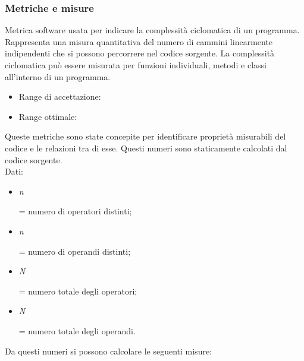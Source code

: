 \documentclass[a4paper,11pt]{article}
\begin{document}
\begin{itemize}
\subsubsection{Metriche e misure}
Metrica software usata per indicare la complessità ciclomatica di un programma. Rappresenta una misura quantitativa del numero di cammini linearmente indipendenti che si possono percorrere nel codice sorgente.  
La complessità ciclomatica può essere misurata per funzioni individuali, metodi e classi all'interno di un programma.
\begin{itemize}
	\item Range di accettazione: \begin{math}[0 - 15]\end{math}
	\item Range ottimale: \begin{math}[0 - 10]\end{math}
	\end{itemize}
 Queste metriche sono state concepite per identificare proprietà misurabili del codice e le relazioni tra di esse. Questi numeri sono staticamente calcolati dal codice sorgente.\\
Dati: 
\begin{itemize}
\item \textit{n}\begin{tiny}{} \end{tiny} = numero di operatori distinti;
\item \textit{n}\begin{tiny}{} \end{tiny} = numero di operandi distinti;
\item \textit{N}\begin{tiny}{} \end{tiny} = numero totale degli operatori;
\item \textit{N}\begin{tiny}{} \end{tiny} = numero totale degli operandi.
\end{itemize}

Da questi numeri si possono calcolare le seguenti misure: 
 

\end{itemize}
\end{document}
